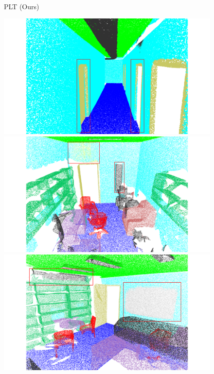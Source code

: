 \begin{figure}[htbp]
    \begin{minipage}{0.1\textwidth}
        \centering
        PLT (Ours)
    \end{minipage}
    \hfill
    \begin{minipage}{0.22\textwidth}
        \centering
        \includegraphics[width=\textwidth]{fig/supplement/semantic_segmentation/hallway_10/PLT_hallway_10.pdf}
    \end{minipage}
    \hfill
    \begin{minipage}{0.22\textwidth}
        \centering
        \includegraphics[width=\textwidth]{fig/supplement/semantic_segmentation/office_9/PLT_office_9.pdf}
    \end{minipage}
    \hfill
    \begin{minipage}{0.22\textwidth}
        \centering
        \includegraphics[width=\textwidth]{fig/supplement/semantic_segmentation/office_35/PLT_office_35.pdf}

\end{minipage}
\end{figure}
